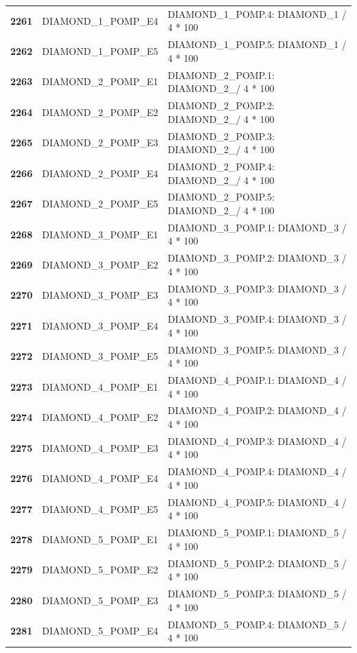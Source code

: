 \documentclass[
  letterpaper,
  DIV=11,
  numbers=noendperiod]{scrartcl}
\begin{document}
\begin{longtable}[t]{>{}cll}
\addlinespace
\textbf{2261} & DIAMOND\_1\_POMP\_E4 & DIAMOND\_1\_POMP.4: DIAMOND\_1 / 4 * 100\\
\textbf{2262} & DIAMOND\_1\_POMP\_E5 & DIAMOND\_1\_POMP.5: DIAMOND\_1 / 4 * 100\\
\textbf{2263} & DIAMOND\_2\_POMP\_E1 & DIAMOND\_2\_POMP.1: DIAMOND\_2\_/ 4 * 100\\
\textbf{2264} & DIAMOND\_2\_POMP\_E2 & DIAMOND\_2\_POMP.2: DIAMOND\_2\_/ 4 * 100\\
\textbf{2265} & DIAMOND\_2\_POMP\_E3 & DIAMOND\_2\_POMP.3: DIAMOND\_2\_/ 4 * 100\\
\addlinespace
\textbf{2266} & DIAMOND\_2\_POMP\_E4 & DIAMOND\_2\_POMP.4: DIAMOND\_2\_/ 4 * 100\\
\textbf{2267} & DIAMOND\_2\_POMP\_E5 & DIAMOND\_2\_POMP.5: DIAMOND\_2\_/ 4 * 100\\
\textbf{2268} & DIAMOND\_3\_POMP\_E1 & DIAMOND\_3\_POMP.1: DIAMOND\_3 / 4 * 100\\
\textbf{2269} & DIAMOND\_3\_POMP\_E2 & DIAMOND\_3\_POMP.2: DIAMOND\_3 / 4 * 100\\
\textbf{2270} & DIAMOND\_3\_POMP\_E3 & DIAMOND\_3\_POMP.3: DIAMOND\_3 / 4 * 100\\
\addlinespace
\textbf{2271} & DIAMOND\_3\_POMP\_E4 & DIAMOND\_3\_POMP.4: DIAMOND\_3 / 4 * 100\\
\textbf{2272} & DIAMOND\_3\_POMP\_E5 & DIAMOND\_3\_POMP.5: DIAMOND\_3 / 4 * 100\\
\textbf{2273} & DIAMOND\_4\_POMP\_E1 & DIAMOND\_4\_POMP.1: DIAMOND\_4 / 4 * 100\\
\textbf{2274} & DIAMOND\_4\_POMP\_E2 & DIAMOND\_4\_POMP.2: DIAMOND\_4 / 4 * 100\\
\textbf{2275} & DIAMOND\_4\_POMP\_E3 & DIAMOND\_4\_POMP.3: DIAMOND\_4 / 4 * 100\\
\addlinespace
\textbf{2276} & DIAMOND\_4\_POMP\_E4 & DIAMOND\_4\_POMP.4: DIAMOND\_4 / 4 * 100\\
\textbf{2277} & DIAMOND\_4\_POMP\_E5 & DIAMOND\_4\_POMP.5: DIAMOND\_4 / 4 * 100\\
\textbf{2278} & DIAMOND\_5\_POMP\_E1 & DIAMOND\_5\_POMP.1: DIAMOND\_5 / 4 * 100\\
\textbf{2279} & DIAMOND\_5\_POMP\_E2 & DIAMOND\_5\_POMP.2: DIAMOND\_5 / 4 * 100\\
\textbf{2280} & DIAMOND\_5\_POMP\_E3 & DIAMOND\_5\_POMP.3: DIAMOND\_5 / 4 * 100\\
\addlinespace
\textbf{2281} & DIAMOND\_5\_POMP\_E4 & DIAMOND\_5\_POMP.4: DIAMOND\_5 / 4 * 100\\

\end{longtable}
\end{document}
